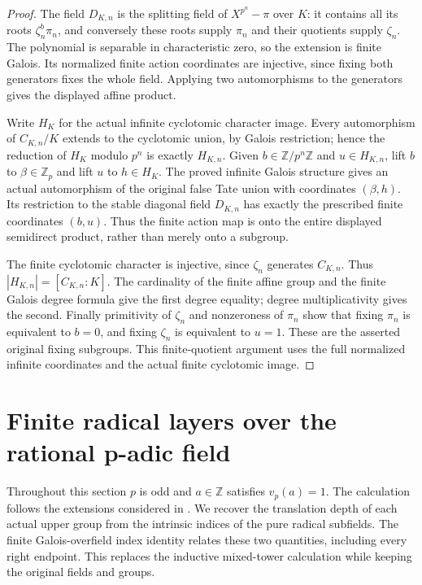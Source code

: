 \begin{proof}
The field $D_{K,n}$ is the splitting field of $X^{p^n}-\pi$ over $K$:
it contains all its roots $\zeta_n^b\pi_n$, and conversely these roots
supply $\pi_n$ and their quotients supply $\zeta_n$.
The polynomial is separable in characteristic zero, so the extension is
finite Galois. Its normalized finite action coordinates are injective,
since fixing both generators fixes the whole field. Applying two
automorphisms to the generators gives the displayed affine product.

Write $H_K$ for the actual infinite cyclotomic character image.
Every automorphism of $C_{K,n}/K$ extends to the cyclotomic union,
by Galois restriction; hence the reduction of $H_K$ modulo $p^n$
is exactly $H_{K,n}$. Given $b\in\mathbb Z/p^n\mathbb Z$ and
$u\in H_{K,n}$, lift $b$ to $\beta\in\mathbb Z_p$ and lift $u$
to $h\in H_K$. The proved infinite Galois structure gives an actual
automorphism of the original false Tate union with coordinates
$(\beta,h)$. Its restriction to the stable diagonal field $D_{K,n}$
has exactly the prescribed finite coordinates $(b,u)$.
Thus the finite action map is onto the entire displayed semidirect
product, rather than merely onto a subgroup.

The finite cyclotomic character is injective, since $\zeta_n$
generates $C_{K,n}$. Thus $|H_{K,n}|=[C_{K,n}:K]$.
The cardinality of the finite affine group and the finite Galois degree
formula give the first degree equality; degree multiplicativity gives
the second. Finally primitivity of $\zeta_n$ and nonzeroness of
$\pi_n$ show that fixing $\pi_n$ is equivalent to $b=0$, and fixing
$\zeta_n$ is equivalent to $u=1$. These are the asserted original
fixing subgroups. This finite-quotient argument uses the full normalized
infinite coordinates and the actual finite cyclotomic image.
\end{proof}

\section{Finite radical layers over the rational p-adic field}

Throughout this section $p$ is odd and $a\in\mathbb Z$ satisfies
$v_p(a)=1$. The calculation follows the extensions considered in
\cite[Section 6]{Viviani2004}. We recover the translation depth of each
actual upper group from the intrinsic indices of the pure radical
subfields. The finite Galois-overfield index identity relates these two
quantities, including every right endpoint. This replaces the inductive
mixed-tower calculation while keeping the original fields and groups.

